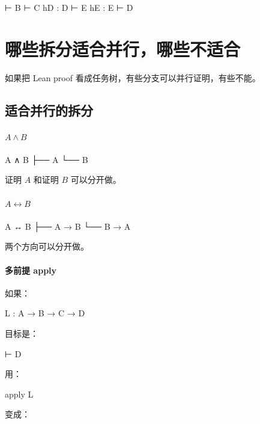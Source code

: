 \documentclass[UTF8,12pt]{ctexart}
\begin{document}
\begin{LeanCode}
⊢ B
⊢ C
hD : D ⊢ E
hE : E ⊢ D
\end{LeanCode}

\section{哪些拆分适合并行，哪些不适合}

如果把 Lean proof 看成任务树，有些分支可以并行证明，有些不能。

\subsection{适合并行的拆分}

\paragraph{\(A \land B\)}

\begin{Tree}
A ∧ B
├── A
└── B
\end{Tree}

证明 \(A\) 和证明 \(B\) 可以分开做。

\paragraph{\(A \leftrightarrow B\)}

\begin{Tree}
A ↔ B
├── A → B
└── B → A
\end{Tree}

两个方向可以分开做。

\paragraph{多前提 apply}

如果：

\begin{LeanCode}
L : A → B → C → D
\end{LeanCode}

目标是：

\begin{LeanCode}
⊢ D
\end{LeanCode}

用：

\begin{LeanCode}
apply L
\end{LeanCode}

变成：
\end{document}
